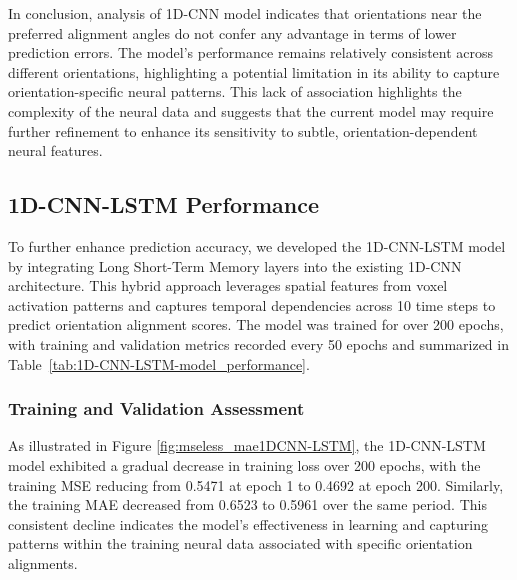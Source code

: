 \documentclass[a4paper]{article}
\begin{document}
\noindent In conclusion, analysis of 1D-CNN model indicates that orientations near the preferred alignment angles do not confer any advantage in terms of lower prediction errors. The model's performance remains relatively consistent across different orientations, highlighting a potential limitation in its ability to capture orientation-specific neural patterns. This lack of association highlights the complexity of the neural data and suggests that the current model may require further refinement to enhance its sensitivity to subtle, orientation-dependent neural features. 

\subsection{\textbf{1D-CNN-LSTM Performance}}

 To further enhance prediction accuracy, we developed the 1D-CNN-LSTM model by integrating Long Short-Term Memory layers into the existing 1D-CNN architecture. This hybrid approach leverages spatial features from voxel activation patterns and captures temporal dependencies across 10 time steps to predict orientation alignment scores. The model was trained for over 200 epochs, with training and validation metrics recorded every 50 epochs and summarized in Table~\ref{tab:1D-CNN-LSTM-model_performance}.

\subsubsection{Training and Validation Assessment}

As illustrated in Figure \ref{fig:mseless_mae1DCNN-LSTM}, the 1D-CNN-LSTM model exhibited a gradual decrease in training loss over 200 epochs, with the training MSE reducing from 0.5471 at epoch 1 to 0.4692 at epoch 200. Similarly, the training MAE decreased from 0.6523 to 0.5961 over the same period. This consistent decline indicates the model's effectiveness in learning and capturing patterns within the training neural data associated with specific orientation alignments.\\
\end{document}
